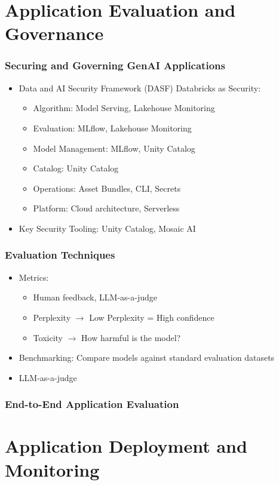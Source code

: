 \documentclass[11pt]{scrartcl}
\begin{document}
\newpage
\section{Application Evaluation and Governance}
\subsubsection*{Securing and Governing GenAI Applications}
\begin{itemize}
	\item Data and AI Security Framework (DASF)
	Databricks as Security:
	\begin{itemize}
		\item Algorithm: Model Serving, Lakehouse Monitoring
		\item Evaluation: MLflow, Lakehouse Monitoring
		\item Model Management: MLflow, Unity Catalog
		\item Catalog: Unity Catalog
		\item Operations: Asset Bundles, CLI, Secrets
		\item Platform: Cloud architecture, Serverless
	\end{itemize}
	\item Key Security Tooling: Unity Catalog, Mosaic AI
\end{itemize}


\subsubsection*{Evaluation Techniques}
\begin{itemize}
	\item Metrics: 
	\begin{itemize}
		\item Human feedback, LLM-as-a-judge
		\item Perplexity $\to$ Low Perplexity = High confidence
		\item Toxicity $\to$ How harmful is the model?
	\end{itemize}
	\item Benchmarking: Compare models against standard evaluation datasets
	\item LLM-as-a-judge
\end{itemize}

\subsubsection*{End-to-End Application Evaluation}


\newpage
\section{Application Deployment and Monitoring}
\end{document}
